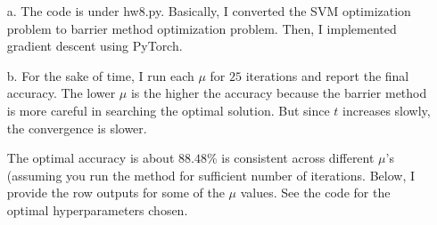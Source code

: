 \documentclass[11pt]{article}
\theoremstyle{remark}
\begin{document}
\color{blue}
\begin{itemize}
\item[a.] The code is under hw8.py. Basically, I converted the SVM optimization problem to barrier method optimization problem. Then, I implemented gradient descent using PyTorch.

\item[b.] For the sake of time, I run each $\mu$ for $25$ iterations and report the final accuracy. The lower $\mu$ is the higher the accuracy because the barrier method is more careful in searching the optimal solution. But since $t$ increases slowly, the convergence is slower.

The optimal accuracy is about $88.48\%$ is consistent across different $\mu$'s (assuming you run the method for sufficient number of iterations. Below, I provide the row outputs for some of the $\mu$ values. See the code for the optimal hyperparameters chosen.


\end{itemize}
\end{document}
